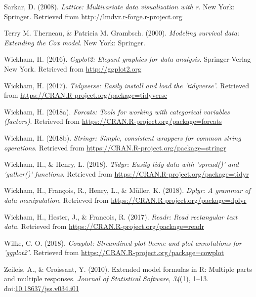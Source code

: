 \documentclass[man, fleqn, noextraspace]{apa6}
\theoremstyle{definition}
\theoremstyle{definition}
\theoremstyle{definition}
\theoremstyle{remark}
\begin{document}
\hypertarget{ref-R-lattice}{}
Sarkar, D. (2008). \emph{Lattice: Multivariate data visualization with
r}. New York: Springer. Retrieved from
\url{http://lmdvr.r-forge.r-project.org}

\hypertarget{ref-R-survival-book}{}
Terry M. Therneau, \& Patricia M. Grambsch. (2000). \emph{Modeling
survival data: Extending the Cox model}. New York: Springer.

\hypertarget{ref-R-ggplot2}{}
Wickham, H. (2016). \emph{Ggplot2: Elegant graphics for data analysis}.
Springer-Verlag New York. Retrieved from \url{http://ggplot2.org}

\hypertarget{ref-R-tidyverse}{}
Wickham, H. (2017). \emph{Tidyverse: Easily install and load the
'tidyverse'}. Retrieved from
\url{https://CRAN.R-project.org/package=tidyverse}

\hypertarget{ref-R-forcats}{}
Wickham, H. (2018a). \emph{Forcats: Tools for working with categorical
variables (factors)}. Retrieved from
\url{https://CRAN.R-project.org/package=forcats}

\hypertarget{ref-R-stringr}{}
Wickham, H. (2018b). \emph{Stringr: Simple, consistent wrappers for
common string operations}. Retrieved from
\url{https://CRAN.R-project.org/package=stringr}

\hypertarget{ref-R-tidyr}{}
Wickham, H., \& Henry, L. (2018). \emph{Tidyr: Easily tidy data with
'spread()' and 'gather()' functions}. Retrieved from
\url{https://CRAN.R-project.org/package=tidyr}

\hypertarget{ref-R-dplyr}{}
Wickham, H., François, R., Henry, L., \& Müller, K. (2018). \emph{Dplyr:
A grammar of data manipulation}. Retrieved from
\url{https://CRAN.R-project.org/package=dplyr}

\hypertarget{ref-R-readr}{}
Wickham, H., Hester, J., \& Francois, R. (2017). \emph{Readr: Read
rectangular text data}. Retrieved from
\url{https://CRAN.R-project.org/package=readr}

\hypertarget{ref-R-cowplot}{}
Wilke, C. O. (2018). \emph{Cowplot: Streamlined plot theme and plot
annotations for 'ggplot2'}. Retrieved from
\url{https://CRAN.R-project.org/package=cowplot}

\hypertarget{ref-R-Formula}{}
Zeileis, A., \& Croissant, Y. (2010). Extended model formulas in R:
Multiple parts and multiple responses. \emph{Journal of Statistical
Software}, \emph{34}(1), 1--13.
doi:\href{https://doi.org/10.18637/jss.v034.i01}{10.18637/jss.v034.i01}

\endgroup
\end{document}
